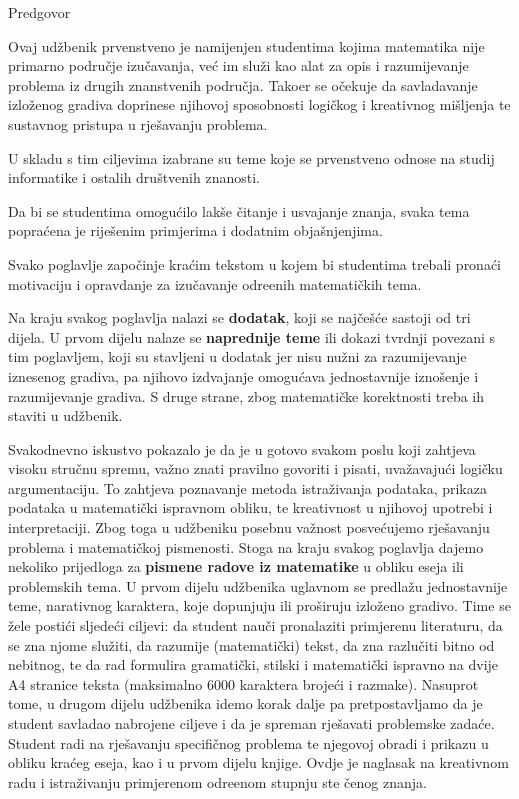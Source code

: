 \begin{preface}{Predgovor}


Ovaj ud\v{z}benik prvenstveno je namijenjen studentima kojima
matematika nije primarno podru\v{c}je izu\v{c}avanja, ve\'c im
slu\v{z}i kao alat za opis i razumijevanje problema iz drugih
znanstvenih podru\v{c}ja. Tako\dj{}er se o\v{c}ekuje da
savladavanje izlo\v{z}enog gradiva doprinese njihovoj sposobnosti
logi\v{c}kog i kreativnog mi\v{s}ljenja te sustavnog pristupa u
rje\v{s}avanju problema.

U skladu s tim ciljevima izabrane su teme koje se prvenstveno
odnose na studij informatike i ostalih dru\v{s}tvenih znanosti.

Da bi se studentima omogu\'cilo lak\v{s}e \v{c}itanje i usvajanje
znanja, svaka tema popra\'cena je rije\v{s}enim primjerima i
dodatnim obja\v{s}njenjima.

Svako poglavlje zapo\v{c}inje  kra\'cim tekstom u kojem bi
studentima trebali prona\'ci motivaciju i opravdanje za
izu\v{c}avanje odre\dj{}enih matemati\v{c}kih tema.

Na kraju svakog poglavlja nalazi se \textbf{dodatak}, koji se
naj\v{c}e\v{s}\'ce sastoji od tri dijela. U prvom dijelu nalaze se
\textbf{naprednije teme} ili dokazi tvrdnji povezani s tim
poglavljem, koji su  stavljeni u dodatak jer nisu nu\v{z}ni za
razumijevanje iznesenog gradiva, pa njihovo izdvajanje omogu\'cava
jednostavnije izno\v{s}enje i razumijevanje gradiva. S druge
strane, zbog matemati\v{c}ke korektnosti treba ih staviti u
ud\v{z}benik.

Svakodnevno iskustvo pokazalo je da je u gotovo svakom poslu koji
zahtjeva visoku stru\v{c}nu spremu, va\v{z}no znati pravilno
govoriti i pisati, uva\v{z}avaju\'{c}i logi\v{c}ku argumentaciju.
To zahtjeva poznavanje metoda istra\v{z}ivanja podataka, prikaza
podataka u matemati\v{c}ki ispravnom obliku, te kreativnost u
njihovoj upotrebi i interpretaciji. Zbog toga   u   ud\v{z}beniku
posebnu va\v{z}nost posve\'{c}ujemo rje\v{s}avanju problema i
matemati\v{c}koj pismenosti. Stoga na kraju svakog poglavlja
dajemo nekoliko prijedloga za \textbf{pismene radove iz
matematike} u obliku eseja ili problemskih tema. U prvom dijelu
ud\v{z}benika uglavnom se predla\v{z}u jednostavnije teme,
narativnog karaktera, koje dopunjuju ili pro\v{s}iruju
izlo\v{z}eno gradivo. Time se \v{z}ele posti\'ci sljede\'ci
ciljevi: da student nau\v{c}i pronalaziti primjerenu literaturu,
da se zna njome slu\v{z}iti, da razumije (matemati\v{c}ki) tekst,
da zna razlu\v{c}iti bitno od nebitnog, te da rad formulira
gramati\v{c}ki, stilski i matemati\v{c}ki ispravno na dvije A4
stranice teksta (maksimalno 6000 karaktera broje\'{c}i i razmake).
 Nasuprot tome, u drugom dijelu
ud\v{z}benika idemo korak dalje pa pretpostavljamo da je student
savladao nabrojene ciljeve i da je spreman rje\v{s}avati
problemske zada\'{c}e. Student radi na rje\v{s}avanju
specifi\v{c}nog problema te njegovoj obradi i prikazu u obliku
kra\'{c}eg eseja, kao i u prvom dijelu knjige. Ovdje je naglasak
na kreativnom radu i istra\v{z}ivanju primjerenom odre\dj enom stupnju ste%
\v{c}enog znanja.


\end{preface}
